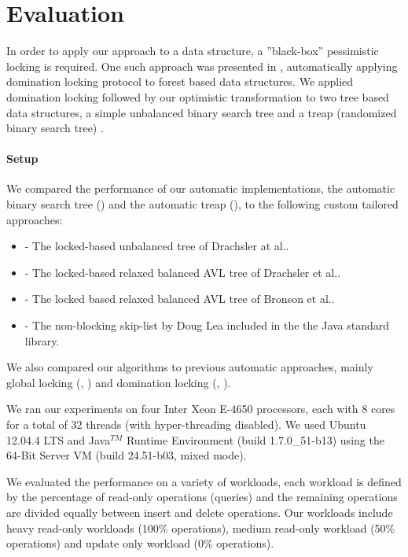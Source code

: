 \section{Evaluation}\label{sec:eval}
In order to apply our approach to a data structure, a
''black-box'' pessimistic locking is required. One such 
approach was presented in \cite{Gueta2011}, automatically 
applying domination locking protocol to forest based data structures.  
We applied domination locking followed by our optimistic 
transformation to two tree based data structures, 
a simple unbalanced binary search tree 
and a treap (randomized binary search tree) \cite{AragonS1989}.

\paragraph{Setup}
We compared the performance of our automatic implementations, 
the automatic binary search tree (\autoTree) and the automatic
treap (\autoTreap), to the following custom tailored approaches: 
\begin{itemize}
\item \danaTree - The locked-based 
				unbalanced tree of Drachsler at al.\cite{DrachslerVY2014}. 
\item \danaAVL - The locked-based relaxed balanced AVL tree of 
				Drachsler et al.\cite{DrachslerVY2014}.
\item \bronson - The locked based relaxed balanced AVL tree
				of Bronson et al.\cite{BronsonCCO2010}.
\item \skiplist - The non-blocking skip-list by Doug 
				Lea included in the 
				the Java standard library.
\end{itemize}

We also compared our algorithms to previous automatic approaches, 
mainly global locking (\globalTree, \globalTreap) 
and domination locking (\domTree, \domTreap). 

We ran our experiments on four Inter Xeon E-4650 processors, 
each with 8 cores for a total of 32 threads 
(with hyper-threading disabled). 
We used Ubuntu 12.04.4 LTS and Java$^{TM}$ Runtime Environment (build
1.7.0\_51-b13) using the 64-Bit Server VM (build 24.51-b03, mixed mode).


We evaluated the performance on a variety of workloads, 
each workload is defined by the percentage of read-only
operations (\getOP queries) and the remaining operations 
are divided equally between insert and delete operations.
Our workloads include heavy read-only workloads
(100\% \getOP operations), medium read-only workload 
(50\% \getOP operations) and update only workload
(0\% \getOP operations). 

